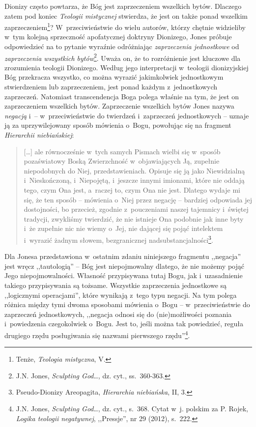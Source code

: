 Dionizy często powtarza, że Bóg jest zaprzeczeniem wszelkich bytów. Dlaczego zatem pod koniec \textit{Teologii mistycznej} stwierdza, że jest on także ponad wszelkim zaprzeczeniem\footnote{Tenże, \textit{Teologia mistyczna}, V.}? W~przeciwieństwie do wielu autorów, którzy chętnie widzieliby w~tym kolejną sprzeczność apofatycznej doktryny Dionizego, Jones próbuje odpowiedzieć na to pytanie wyraźnie odróżniając \textit{zaprzeczenia jednostkowe} od \textit{zaprzeczenia wszystkich bytów}\footnote{J.N. Jones, \textit{Sculpting God}\ldots, dz. cyt., ss.~360-363.}. Uważa on, że to rozróżnienie jest kluczowe dla zrozumienia teologii Dionizego. Według jego interpretacji w~teologii dionizyjskiej Bóg przekracza wszystko, co można wyrazić jakimkolwiek jednostkowym stwierdzeniem lub zaprzeczeniem, jest ponad każdym z~jednostkowych zaprzeczeń. Natomiast transcendencja Boga polega właśnie na tym, że jest on zaprzeczeniem wszelkich bytów. Zaprzeczenie wszelkich bytów Jones nazywa \textit{negacją} i~-- w~przeciwieństwie do twierdzeń i~zaprzeczeń jednostkowych -- uznaje ją za uprzywilejowany sposób mówienia o~Bogu, powołując się na fragment \textit{Hierarchii niebiańskiej}:

\begin{quote}
[\ldots] ale równocześnie w~tych samych Pismach wielbi się w~sposób pozaświatowy Boską Zwierzchność w~objawiających Ją, zupełnie niepodobnych do Niej, przedstawieniach. Opisuje się ją jako Niewidzialną i~Nieskończoną, i~Niepojętą, i~jeszcze innymi imionami, które nie oddają tego, czym Ona jest, a~raczej to, czym Ona nie jest. Dlatego wydaje mi się, że ten sposób -- mówienia o~Niej przez negację -- bardziej odpowiada jej dostojności, bo przecież, zgodnie z~pouczeniami naszej tajemnicy i~świętej tradycji, zwykliśmy twierdzić, że nie istnieje Ona podobnie jak inne byty i~że zupełnie nic nie wiemy o~Jej, nie dającej się pojąć intelektem i~wyrazić żadnym słowem, bezgranicznej nadsubstancjalności\footnote{Pseudo-Dionizy Areopagita, \textit{Hierarchia niebiańska}, II, 3.}.
\end{quote}

Dla Jonesa przedstawiona w~ostatnim zdaniu niniejszego fragmentu ,,negacja'' jest wręcz ,,tautologią'' -- Bóg jest niepojmowalny dlatego, że nie możemy pojąć Jego niepojmowalności. Własność przypisywana tutaj Bogu, jak i~uzasadnienie takiego przypisywania są tożsame. Wszystkie zaprzeczenia jednostkowe są ,,logicznymi operacjami'', które wynikają z~tego typu negacji. Na tym polega różnica między tymi dwoma sposobami mówienia o~Bogu -- w~przeciwieństwie do zaprzeczeń jednostkowych, ,,negacja odnosi się do (nie)możliwości poznania i~powiedzenia czegokolwiek o~Bogu. Jest to, jeśli można tak powiedzieć, reguła drugiego rzędu posługiwania się nazwami pierwszego rzędu''\footnote{J.N. Jones, \textit{Sculpting God}\ldots, dz. cyt., s.~368. Cytat w~j. polskim za P. Rojek, \textit{Logika teologii negatywnej}, ,,Pressje'', nr 29 (2012), s.~222.}.


